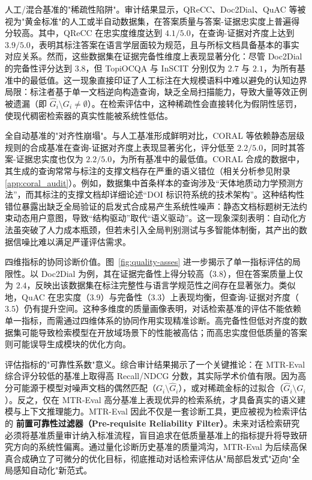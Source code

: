 人工/混合基准的"稀疏性陷阱"。审计结果显示，QReCC、Doc2Dial、QuAC 等被视为"黄金标准"的人工或半自动数据集，在答案质量与答案-证据忠实度上普遍得分较高。其中，QReCC 在忠实度维度达到 $4.1/5.0$，在查询-证据对齐度上达到 $3.9/5.0$，表明其标注答案在语言学层面较为规范，且与所标文档具备基本的事实对应关系。然而，这些数据集在证据完备性维度上表现显著分化：尽管 Doc2Dial 的完备性评分达到 $3.8$，但 TopiOCQA 与 InSCIT 分别仅为 $2.7$ 与 $2.1$，为所有基准中的最低值。这一现象直接印证了人工标注在大规模语料中难以避免的认知边界局限：标注者基于单一文档逆向构造查询，缺乏全局扫描能力，导致大量等效正例被遗漏（即 $\hat{G}_i \setminus G_i \neq \emptyset$）。在检索评估中，这种稀疏性会直接转化为假阴性惩罚，使现代稠密检索器的真实性能被系统性低估。


全自动基准的"对齐性崩塌"。与人工基准形成鲜明对比，CORAL 等依赖静态层级规则的合成基准在查询-证据对齐度上表现显著劣化，评分低至 $2.2/5.0$，同时其答案-证据忠实度也仅为 $2.2/5.0$，为所有基准中的最低值。CORAL 合成的数据中，其生成的查询常常与标注的支撑文档存在严重的语义错位（相关分析参见附录\ref{app:coral_audit}）。例如，数据集中首条样本的查询涉及“天体地质动力学预测方法”，而其标注的支撑文档却详细论述“DOI 标识符系统的技术架构”。这种结构性错位暴露出缺乏全局验证的启发式合成易产生系统性噪声：静态文档标题树无法约束动态用户意图，导致“结构驱动”取代“语义驱动”。这一现象深刻表明：自动化方法虽突破了人力成本瓶颈，但若未引入全局判别测试与多智能体制衡，其产出的数据信噪比难以满足严谨评估需求。



四维指标的协同诊断价值。图~\ref{fig:quality-asses} 进一步揭示了单一指标评估的局限性。以 Doc2Dial 为例，其在证据完备性上得分较高（$3.8$），但在答案质量上仅为 $2.4$，反映出该数据集在标注完整性与语言学规范性之间存在显著张力。类似地，QuAC 在忠实度（$3.9$）与完备性（$3.3$）上表现均衡，但查询-证据对齐度（$3.5$）仍有提升空间。这种多维度的质量画像表明，对话检索基准的评估不能依赖单一指标，而需通过四维体系的协同作用实现精准诊断。高完备性但低对齐度的数据集可能导致检索模型在开放域场景下的性能被高估；而高忠实度但低质量的答案则可能误导生成模块的优化方向。


评估指标的"可靠性系数"意义。综合审计结果揭示了一个关键推论：在 MTR-Eval 综合评分较低的基准上取得高 Recall/NDCG 分数，其实际学术价值有限。因为高分可能源于模型对噪声文档的偶然匹配（$G_i \setminus \hat{G}_i$），或对稀疏金标的过拟合（$\hat{G}_i \setminus G_i$）。反之，仅在 MTR-Eval 高分基准上表现优异的检索系统，才具备真实的语义建模与上下文推理能力。MTR-Eval 因此不仅是一套诊断工具，更应被视为检索评估的 \textbf{前置可靠性过滤器（Pre-requisite Reliability Filter）}。未来对话检索研究必须将基准质量审计纳入标准流程，盲目追求在低质量基准上的指标提升将导致研究方向的系统性偏离。通过量化诊断历史基准的质量鸿沟，MTR-Eval 为后续高保真合成确立了可微分的优化目标，彻底推动对话检索评估从"局部启发式"迈向"全局感知自动化"新范式。







